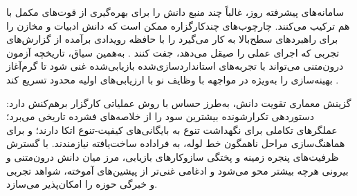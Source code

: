 سامانه‌های پیشرفته روز، غالباً چند منبع دانش را برای بهره‌گیری از قوت‌های مکمل با هم ترکیب می‌کنند. چارچوب‌های چندکارگزاره ممکن است  که دانش ادبیات و مخازن را برای راهبردهای سطح‌بالا به کار می‌گیرد را با حافظه رویدادی برآمده از گزارش‌های تجربی که اجرای عملی را صیقل می‌دهد، جفت کنند \cite{trirat2025automlagent, Yang2025NADER}. به‌همین سیاق، تاریخچه آزمون درون‌متنی می‌تواند با تجربه‌های استانداردسازی‌شده بازیابی‌شده غنی شود تا گرم‌آغاز بهینه‌سازی را به‌ویژه در مواجهه با وظایف نو با ارزیابی‌های اولیه محدود تسریع کند \cite{zhang-etal-2024-MLCopilot}.

گزینش معماری تقویت دانش، به‌طرز حساس با روش عملیاتی کارگزار برهم‌کنش دارد: دستوردهی تکرارشونده بیشترین سود را از خلاصه‌های فشرده تاریخی می‌برد؛ عملگرهای تکاملی برای نگهداشت تنوع به بایگانی‌های کیفیت-تنوع اتکا دارند؛ و  برای هماهنگ‌سازی مراحل ناهمگون خط لوله، به فراداده ساخت‌یافته نیازمندند. با گسترش ظرفیت‌های پنجره زمینه و پختگی سازوکارهای بازیابی، مرز میان دانش درون‌متنی و بیرونی هرچه بیشتر محو می‌شود و ادغامی غنی‌تر از پیشین‌های آموخته، شواهد تجربی و خبرگی حوزه را امکان‌پذیر می‌سازد.